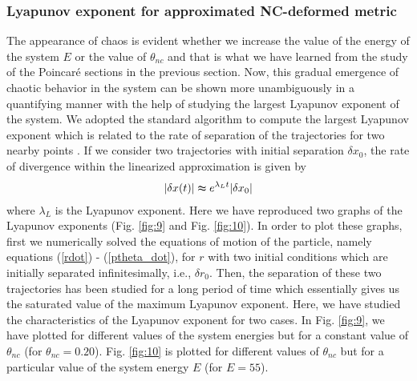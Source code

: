 \documentclass[aps,prd,showpacs,nofootinbib,floats,floatfix,preprintnumbers,groupedaddress,twocolumn]{revtex4-1}
\begin{document}
\subsubsection{Lyapunov exponent for approximated  NC-deformed metric}
%
%
%
%
\par\noindent
The appearance of chaos is evident whether we increase the value of the energy of the system $E$ or the value of $\theta_{nc}$  and that is what we have learned from the study of the Poincar\'e sections in the previous section. Now, this gradual emergence of chaotic behavior in the system can be shown more unambiguously in a quantifying manner with the help of studying the largest Lyapunov exponent of the system. We adopted the standard algorithm to compute the largest Lyapunov exponent which is related to the rate of separation of the trajectories for two nearby points \cite{sandri:96}. If we consider two trajectories with initial separation $\delta x_{0}$, the rate of divergence within the linearized approximation is given by 
%
%
%
%
\begin{eqnarray}
\vert\delta x(t)\vert\thickapprox e^{\lambda_{L}t}\vert\delta x_{0}\vert
\end{eqnarray}
%
%
%
%
where $\lambda_{L}$ is the Lyapunov exponent. Here we have reproduced two  graphs of the Lyapunov exponents (Fig. \ref{fig:9} and Fig. \ref{fig:10}). In order to plot these graphs, first we numerically solved the equations of motion of the particle, namely equations (\ref{rdot}) -  (\ref{ptheta_dot}), for $r$ with two initial conditions which are initially separated infinitesimally, i.e., $\delta r_{0}$. Then, the separation of these two trajectories has been studied for a long period of time which essentially gives us the saturated value of the maximum Lyapunov exponent. Here, we have studied the characteristics of the Lyapunov exponent for two cases. In Fig. \ref{fig:9}, we have plotted for different values of the system energies but for a constant value of $\theta_{nc}$ (for $\theta_{nc}=0.20$). Fig. \ref{fig:10} is plotted for different values of $\theta_{nc}$ but for a particular value of the system energy $E$ (for $E=55$).
\end{document}
